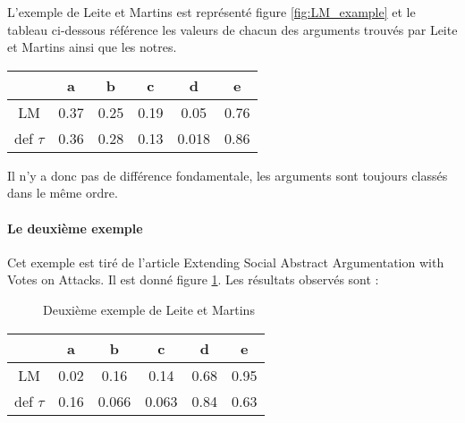 \documentclass[12pt]{article}
\theoremstyle{defi}
\theoremstyle{not}
\theoremstyle{prob}
\begin{document}
L'exemple de Leite et Martins est représenté figure \ref{fig:LM_example} et le tableau ci-dessous référence les valeurs de chacun des arguments trouvés par Leite et Martins ainsi que les notres.

\begin{tabular}{|c|c|c|c|c|c|}
  \hline
             & a    & b    & c    & d     & e \\
  \hline
  LM         & 0.37 & 0.25 & 0.19 & 0.05  & 0.76 \\
  \hline
  def $\tau$ & 0.36 & 0.28 & 0.13 & 0.018 & 0.86\\
  \hline
\end{tabular}

Il n'y a donc pas de différence fondamentale, les arguments sont toujours classés dans le même ordre.

\paragraph{Le deuxième exemple\\}
Cet exemple est tiré de l'article Extending Social Abstract Argumentation with Votes on Attacks. Il est donné figure \ref{fig:LM2_example}. Les résultats observés sont :

\begin{figure}
\centering
{}
\color{blue}
\caption{Deuxième exemple de Leite et Martins}
\label{fig:LM2_example}
\end{figure}

\begin{tabular}{|c|c|c|c|c|c|}
  \hline
             & a    & b     & c     & d    & e \\
  \hline
  LM         & 0.02 & 0.16  & 0.14  & 0.68 & 0.95 \\
  \hline
  def $\tau$ & 0.16 & 0.066 & 0.063 & 0.84 & 0.63\\
  \hline
\end{tabular}
\end{document}
